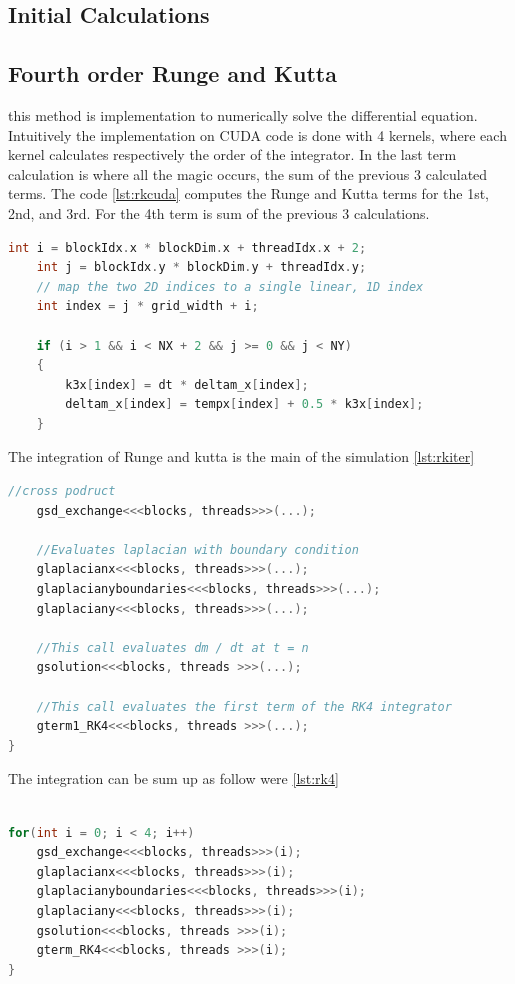 \subsection{Initial Calculations}



\subsection{Fourth order Runge and Kutta}

 this method is implementation to numerically solve the differential equation. Intuitively the implementation on CUDA code is done with 4 kernels, where each kernel calculates respectively the order of the integrator. In the last term calculation is where all the magic occurs, the sum of the previous 3 calculated terms. The code \ref{lst:rkcuda} computes the Runge and Kutta terms for the 1st, 2nd, and 3rd. For the 4th term is sum of the previous 3 calculations.

\begin{lstlisting}[language=C++, label={lst:rkcuda}, caption={CPU Vector Addition}]
    int i = blockIdx.x * blockDim.x + threadIdx.x + 2;
    int j = blockIdx.y * blockDim.y + threadIdx.y;
    // map the two 2D indices to a single linear, 1D index
    int index = j * grid_width + i;

    if (i > 1 && i < NX + 2 && j >= 0 && j < NY)
    {
        k3x[index] = dt * deltam_x[index];
        deltam_x[index] = tempx[index] + 0.5 * k3x[index];   
    }
\end{lstlisting}

The integration of Runge and kutta is the main of the simulation \ref{lst:rkiter}

\begin{lstlisting}[language=C++, label={lst:rkiter}, caption={Runge y Kutta integration}]
	//cross podruct
    gsd_exchange<<<blocks, threads>>>(...);

	//Evaluates laplacian with boundary condition
    glaplacianx<<<blocks, threads>>>(...);
    glaplacianyboundaries<<<blocks, threads>>>(...);
    glaplaciany<<<blocks, threads>>>(...);

    //This call evaluates dm / dt at t = n
    gsolution<<<blocks, threads >>>(...);

    //This call evaluates the first term of the RK4 integrator
    gterm1_RK4<<<blocks, threads >>>(...);
}
\end{lstlisting}


The integration can be sum up as follow were
\ref{lst:rk4}
\begin{lstlisting}[language=C++, label={lst:rk4}, caption={Runge y Kutta integration}]	

for(int i = 0; i < 4; i++)
    gsd_exchange<<<blocks, threads>>>(i);
    glaplacianx<<<blocks, threads>>>(i);
    glaplacianyboundaries<<<blocks, threads>>>(i);
    glaplaciany<<<blocks, threads>>>(i);
    gsolution<<<blocks, threads >>>(i);
    gterm_RK4<<<blocks, threads >>>(i);
}
\end{lstlisting}


